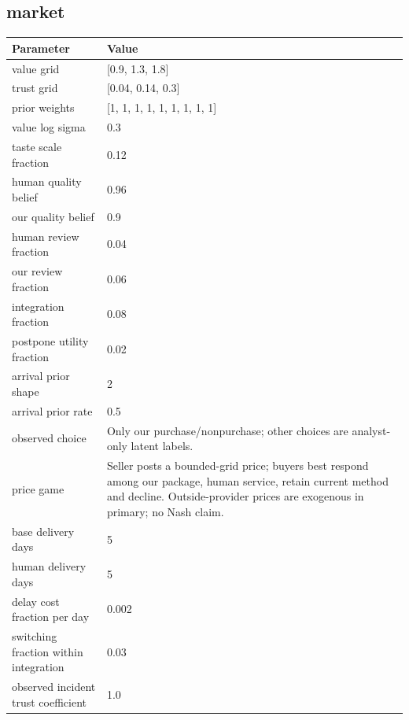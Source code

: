 \documentclass[10pt]{article}
\begin{document}
\subsection*{market}

\begin{longtable}{p{.44\linewidth}p{.50\linewidth}}\toprule Parameter & Value \\\midrule\endhead

value grid & [0.9, 1.3, 1.8]\\

trust grid & [0.04, 0.14, 0.3]\\

prior weights & [1, 1, 1, 1, 1, 1, 1, 1, 1]\\

value log sigma & 0.3\\

taste scale fraction & 0.12\\

human quality belief & 0.96\\

our quality belief & 0.9\\

human review fraction & 0.04\\

our review fraction & 0.06\\

integration fraction & 0.08\\

postpone utility fraction & 0.02\\

arrival prior shape & 2\\

arrival prior rate & 0.5\\

observed choice & Only our purchase/nonpurchase; other choices are analyst-only latent labels.\\

price game & Seller posts a bounded-grid price; buyers best respond among our package, human service, retain current method and decline. Outside-provider prices are exogenous in primary; no Nash claim.\\

base delivery days & 5\\

human delivery days & 5\\

delay cost fraction per day & 0.002\\

switching fraction within integration & 0.03\\

observed incident trust coefficient & 1.0\\

\bottomrule\end{longtable}
\end{document}
